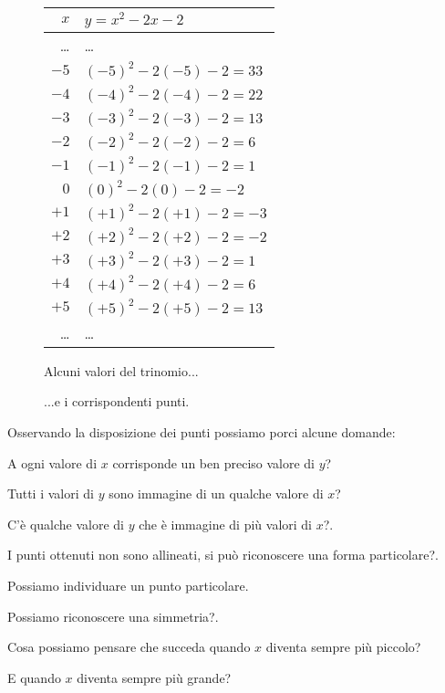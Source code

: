 \begin{figure}[h]
 \centering
 \begin{minipage}[]{.48\textwidth}
  \begin{center}
   \begin{tabular}{r|l}
    \(x\)   & \(y=x^2-2x-2\) \\
    \hline
    \dots & \dots \\
    \(-5\) & \((-5)^2 -2(-5) -2 = 33\) \\
    \(-4\) & \((-4)^2 -2(-4) -2 = 22\) \\
    \(-3\) & \((-3)^2 -2(-3) -2 = 13\) \\
    \(-2\) & \((-2)^2 -2(-2) -2 = 6\) \\
    \(-1\) & \((-1)^2 -2(-1) -2 = 1\) \\
     \(0\) & \((0)^2 -2(0) -2 = -2\) \\
    \(+1\) & \((+1)^2 -2(+1) -2 = -3\) \\
    \(+2\) & \((+2)^2 -2(+2) -2 = -2\) \\
    \(+3\) & \((+3)^2 -2(+3) -2 = 1\) \\
    \(+4\) & \((+4)^2 -2(+4) -2 = 6\) \\
    \(+5\) & \((+5)^2 -2(+5) -2 = 13\) \\
    \dots & \dots \\
   \end{tabular}
  \caption{Alcuni valori del trinomio...} \label{tab:trinomio0}
  \end{center}
 \end{minipage}
\begin{minipage}[]{.48\textwidth}
\begin{center}
\begin{inaccessibleblock}
  \puntia
  \caption{...e i corrispondenti punti.} \label{fig:trinomio0}
\end{inaccessibleblock}
\end{center}
\end{minipage}
\end{figure}

Osservando la disposizione dei punti possiamo porci alcune domande:
\begin{enumerate*}
 \item A ogni valore di \(x\) corrisponde un ben preciso valore di \(y\)?
 \item Tutti i valori di \(y\) sono immagine di un qualche valore di \(x\)?
 \item C'è qualche valore di \(y\) che è immagine di più valori di \(x\)?.
 \item I punti ottenuti non sono allineati, si può riconoscere una forma 
  particolare?.
 \item Possiamo individuare un punto particolare.
 \item Possiamo riconoscere una simmetria?.
 \item Cosa possiamo pensare che succeda quando \(x\) diventa sempre più piccolo?
 \item E quando \(x\) diventa sempre più grande?
\end{enumerate*}


